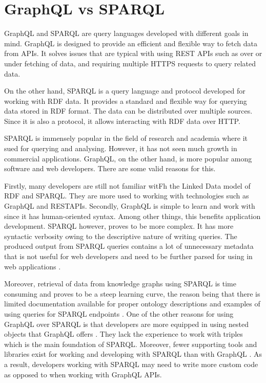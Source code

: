 \section{GraphQL vs SPARQL}

GraphQL and SPARQL are query languages developed with different goals in mind. GraphQL is designed to provide an efficient and flexible way to fetch data from APIs. It solves issues that are typical with using REST APIs such as over or under fetching of data, and requiring multiple HTTPS requests to query related data. 

On the other hand, SPARQL is a query language and protocol developed for working with RDF data. It provides a standard and flexible way for querying data stored in RDF format. The data can be distributed over multiple sources. Since it is also a protocol, it allows interacting with RDF data over HTTP. 

SPARQL is immensely popular in the field of research and academia where it sued for querying and analysing. However, it has not seen much growth in commercial applications. GraphQL, on the other hand, is more popular among software and web developers. There are some valid reasons for this.  

Firstly, many developers are still not familiar witFh the Linked Data model of RDF and SPARQL. They are more used to working with technologies such as GraphQL and RESTAPIs. Secondly, GraphQL is simple to learn and work with since it has human-oriented syntax. Among other things, this benefits application development. SPARQL however, proves to be more complex. It has more syntactic verbosity owing to the descriptive nature of writing queries. The produced output from SPARQL queries contains a lot of unnecessary metadata that is not useful for web developers and need to be further parsed for using in web applications \cite{Lisena2018}. 

Moreover, retrieval of data from knowledge graphs using SPARQL is time consuming and proves to be a steep learning curve, the reason being that there is limited documentation available for proper ontology descriptions and examples of using queries for SPARQL endpoints \cite{Angele2022}. One of the other reasons for using GraphQL over SPARQL is that developers are more equipped in using nested objects that GraphQL offers \cite{Taelman2018}. They lack the experience to work with triples which is the main foundation of SPARQL. Moreover, fewer supporting tools and libraries exist for working and developing with SPARQL than with GraphQL \cite{Taelman2018}. As a result, developers working with SPARQL may need to write more custom code as opposed to when working with GraphQL APIs.


